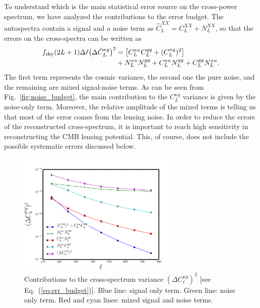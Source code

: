 To understand which is the main statistical error source on the cross-power spectrum, we have analyzed the contributions to the error budget. The autospectra contain a signal and a noise term as $\hat{C}^{XX}_{L} = C^{XX}_{L}+N^{XX}_L$, so that the errors on the cross-spectra can be written as
%
\begin{equation}\label{eq:err_budget}
\begin{split}
f_{\rm{sky}}(2L+1)\Delta\ell \bigl(\Delta\hat{C}^{\kappa g}_L \bigr)^2 &= \bigl[C_{L}^{\kappa\kappa} C_{L}^{gg} + (C_{L}^{\kappa g})^2 \bigr]\\
&+ N^{\kappa\kappa}_LN^{gg}_L + C_{L}^{\kappa\kappa}N^{gg}_L + C_{L}^{gg}N^{\kappa\kappa}_L.
\end{split}
\end{equation}
%
The first term represents the cosmic variance, the second one the pure noise, and the remaining are mixed signal-noise terms. As can be seen from Fig.~\eqref{fig:noise_budget}, the main contribution to the $C^{\kappa g}_L$ variance is given by the noise-only term. Moreover, the relative amplitude of the mixed terms is telling us that most of the error comes from the lensing noise. In order to reduce the errors of the reconstructed cross-spectrum, it is important to reach high sensitivity in reconstructing the \gls{CMB} lensing potential. This, of course, does not include the possible systematic errors discussed below.

\begin{figure} %
\centering %
\includegraphics[width=0.7\textwidth]{Chapter3/Images/f16}
\caption{Contributions to the cross-spectrum variance $(\Delta {C^{\kappa g}_{\ell}})^2$ [see Eq.~(\eqref{eq:err_budget})]. Blue line: signal only term.  Green line: noise only term. Red and cyan lines: mixed signal and noise terms. \label{fig:noise_budget}}
\end{figure}


